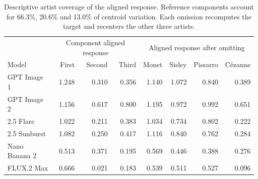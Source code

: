 \begin{table}[htbp]\centering\small
\begin{tabular}{@{}lrrr|rrrr@{}}\toprule
 & \multicolumn{3}{c}{Component aligned response} & \multicolumn{4}{c}{Aligned response after omitting}\\
Model & First & Second & Third & Monet & Sisley & Pissarro & C\'ezanne\\\midrule
GPT Image 1 & 1.248 & 0.310 & 0.356 & 1.140 & 1.072 & 0.840 & 0.389\\
GPT Image 2 & 1.156 & 0.617 & 0.800 & 1.195 & 0.972 & 0.992 & 0.651\\
2.5 Flare & 1.022 & 0.211 & 0.383 & 1.034 & 0.734 & 0.802 & 0.222\\
2.5 Sunburst & 1.082 & 0.250 & 0.417 & 1.116 & 0.840 & 0.762 & 0.284\\
Nano Banana 2 & 0.513 & 0.371 & 0.195 & 0.569 & 0.446 & 0.388 & 0.276\\
FLUX.2 Max & 0.666 & 0.021 & 0.183 & 0.539 & 0.511 & 0.527 & 0.096\\
\bottomrule\end{tabular}
\caption{Descriptive artist coverage of the aligned response. Reference components account for 66.3\%, 20.6\% and 13.0\% of centroid variation. Each omission recomputes the target and recenters the other three artists.}
\label{tab:review-components}\end{table}
